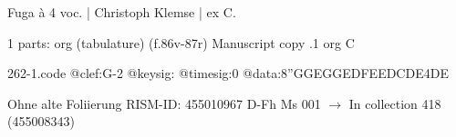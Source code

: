 \documentclass[twocolumn]{book}
\begin{document}
\newline \begin{itshape}[f.86v, at left:] Fuga à 4 voc. | Christoph Klemse | ex C.\end{itshape} 
\newline \textcolor{darkblue}{}  1 parts: org (tabulature)  (f.86v-87r)
\newline Manuscript copy
.1  org  C  
\begin{filecontents*}{262-1.code}
@clef:G-2
@keysig:
@timesig:0
@data:{8''GGEG}{GEDF}{EEDC}{DE}4DE
\end{filecontents*}
\newline
%

\newline Ohne alte Foliierung
\newline RISM-ID: 455010967
\newline D-Fh  Ms 001
\newline $\rightarrow$ In collection 418 (455008343)
      
\end{document}
